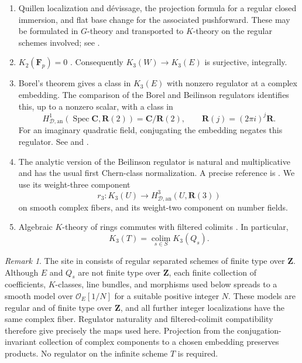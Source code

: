\documentclass[11pt,a4paper]{amsart}
\numberwithin{equation}{section}
\theoremstyle{definition}
\theoremstyle{remark}
\newtheorem{remark}[theorem]{Remark}
\newcommand{\Z}{\mathbf Z}
\newcommand{\R}{\mathbf R}
\newcommand{\C}{\mathbf C}
\newcommand{\F}{\mathbf F}
\newcommand{\OO}{\mathcal O}
\newcommand{\Spec}{\operatorname{Spec}}
\newcommand{\colim}{\operatorname*{colim}}
\newcommand{\HD}{H_{\mathcal D,\mathrm{an}}}
\begin{document}
\begin{enumerate}
\item Quillen localization and d\'evissage, the projection formula for a regular closed immersion, and flat base change for the associated pushforward. These may be formulated in $G$-theory and transported to $K$-theory on the regular schemes involved; see \cite[Sections~5--7]{Quillen}.
\item $K_2(\F_p)=0$ \cite{QuillenFinite}\cite[IV, Corollary~1.13]{Weibel}. Consequently $K_3(W)\to K_3(E)$ is surjective, integrally.
\item Borel's theorem gives a class in $K_3(E)$ with nonzero regulator at a complex embedding. The comparison of the Borel and Beilinson regulators identifies this, up to a nonzero scalar, with a class in
\[
\HD^1(\Spec\C,\R(2))=\C/\R(2),\qquad \R(j)=(2\pi i)^j\R.
\]
For an imaginary quadratic field, conjugating the embedding negates this regulator. See \cite[Proposition~12.2]{Borel} and \cite[Section~6]{BunkeTamme}.
\item The analytic version of the Beilinson regulator is natural and multiplicative and has the usual first Chern-class normalization. A precise reference is \cite[Theorem~2.31]{BunkeTamme}. We use its weight-three component
\[
r_3:K_3(U)\longrightarrow\HD^3(U,\R(3))
\]
on smooth complex fibers, and its weight-two component on number fields.
\item Algebraic $K$-theory of rings commutes with filtered colimits \cite[IV, Section~6.4]{Weibel}. In particular,
\begin{equation}\label{d3:eq:continuity}
K_3(T)=\colim_{s\in S} K_3(Q_s).
\end{equation}
\end{enumerate}

\begin{remark}\label{d3:rem:spreading}
The site in \cite{BunkeTamme} consists of regular separated schemes of finite type over $\Z$. Although $E$ and $Q_s$ are not finite type over $\Z$, each finite collection of coefficients, $K$-classes, line bundles, and morphisms used below spreads to a smooth model over $\OO_E[1/N]$ for a suitable positive integer $N$. These models are regular and of finite type over $\Z$, and all further integer localizations have the same complex fiber. Regulator naturality and filtered-colimit compatibility therefore give precisely the maps used here. Projection from the conjugation-invariant collection of complex components to a chosen embedding preserves products. No regulator on the infinite scheme $T$ is required.
\end{remark}
\end{document}
